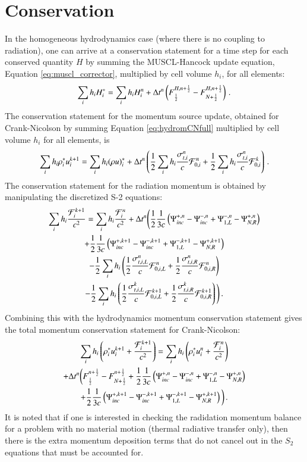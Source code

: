 \section{Conservation}
In the homogeneous hydrodynamics case (where there is no coupling to radiation),
one can arrive at a conservation statement for a time step for each conserved
quantity $H$ by summing the MUSCL-Hancock update equation, Equation
\eqref{eq:muscl_corrector}, multiplied by cell volume $h_i$, for all elements:
\begin{equation}
   \sum\limits_i h_i H_i^* = \sum\limits_i h_i H_i^n
   + \Delta t^n\left(F_{\frac{1}{2}}^{H,n+\frac{1}{2}} - F_{N+\frac{1}{2}}^{H,n+\frac{1}{2}}\right) \, .
\end{equation}
The conservation statement for the momentum source update, obtained for
Crank-Nicolson by summing Equation \eqref{eq:hydromCNfull} multiplied by cell
volume $h_i$ for all elements, is
\begin{equation}
   \sum\limits_i h_i \rho_i^* u_i^{k+1} = \sum\limits_i h_i (\rho u)_i^*
   +\Delta t^n\left(
   \frac{1}{2}\sum\limits_i h_i \frac{\sigma_{t,i}^n}{c}\mathcal{F}_{0,i}^n
   + \frac{1}{2}\sum\limits_i h_i \frac{\sigma_{t,i}^n}{c}\mathcal{F}_{0,i}^k
   \right) \, .
\end{equation}
The conservation statement for the radiation momentum is obtained by
manipulating the discretized S-2 equations:
\begin{multline}
   \sum\limits_i h_i \frac{\mathcal{F}_i^{k+1}}{c^2} = \sum\limits_i h_i \frac{\mathcal{F}_i^n}{c^2}
   + \Delta t^n\Bigg(
   \frac{1}{2}\frac{1}{3c}\left( \Psi^{+,n}_{inc} - \Psi^{-,n}_{inc}
   + \Psi^{-,n}_{1,L} - \Psi^{+,n}_{N,R} \right)\\
   + \frac{1}{2}\frac{1}{3c}\left( \Psi^{+,k+1}_{inc} - \Psi^{-,k+1}_{inc}
   + \Psi^{-,k+1}_{1,L} - \Psi^{+,k+1}_{N,R} \right)\\
   - \frac{1}{2}\sum\limits_i h_i\left( \frac{1}{2}\frac{\sigma_{t,i,L}^n}{c}\mathcal{F}_{0,i,L}^n
   + \frac{1}{2}\frac{\sigma_{t,i,R}^n}{c}\mathcal{F}_{0,i,R}^n \right)\\
   - \frac{1}{2}\sum\limits_i h_i\left( \frac{1}{2}\frac{\sigma_{t,i,L}^k}{c}\mathcal{F}_{0,i,L}^{k+1}
   + \frac{1}{2}\frac{\sigma_{t,i,R}^k}{c}\mathcal{F}_{0,i,R}^{k+1} \right)
   \Bigg) \, .
\end{multline}
Combining this with the hydrodynamics momentum conservation statement
gives the total momentum conservation statement for Crank-Nicolson:
\begin{multline}
   \sum\limits_i h_i\left( \rho_i^* u_i^{k+1} + \frac{\mathcal{F}_i^{k+1}}{c^2} \right) =
   \sum\limits_i h_i\left( \rho_i^* u_i^n + \frac{\mathcal{F}_i^n}{c^2} \right)\\
   + \Delta t^n\bigg(
   F_{\frac{1}{2}}^{n+\frac{1}{2}} - F_{N+\frac{1}{2}}^{n+\frac{1}{2}}
   + \frac{1}{2}\frac{1}{3c}\left( \Psi^{+,n}_{inc} - \Psi^{-,n}_{inc}
   + \Psi^{-,n}_{1,L} - \Psi^{+,n}_{N,R} \right)\\
   + \frac{1}{2}\frac{1}{3c}\left( \Psi^{+,k+1}_{inc} - \Psi^{-,k+1}_{inc}
   + \Psi^{-,k+1}_{1,L} - \Psi^{+,k+1}_{N,R} \right)
   \bigg) \, .
\end{multline}
It is noted that if one is interested in checking the radidation momentum balance for
a problem with no material motion (thermal radiative transfer only), then there is
the extra momentum deposition terms that do not cancel out in the $S_2$ equations
that must be accounted for.


